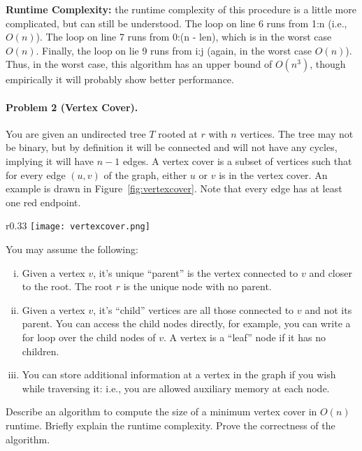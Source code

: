 \documentclass[11pt]{article}
\begin{document}
\textbf{Runtime Complexity:} the runtime complexity of this procedure is a little more complicated, but can still be understood. The loop on line 6 runs from 1:n (i.e., $O(n)$). The loop on line 7 runs from 0:(n - len), which is in the worst case $O(n)$. Finally, the loop on lie 9 runs from i:j (again, in the worst case $O(n)$). Thus, in the worst case, this algorithm has an upper bound of $O(n^3)$, though empirically it will probably show better performance.

\newpage
\paragraph{Problem 2 (Vertex Cover).} You are given an undirected tree $T$ rooted at $r$ with $n$ vertices. The tree may not be binary, but by definition it will be connected and will not have any cycles, implying it will have $n-1$ edges. A vertex cover is a subset of vertices such that for every edge $(u, v)$ of the graph, either $u$ or $v$ is in the vertex cover. An  example is drawn in Figure~\ref{fig:vertexcover}. Note that every edge has at least one red endpoint.

\begin{wrapfigure}{r}{0.33\textwidth}
    \centering
    \texttt{[image: vertexcover.png]}
    \caption{Example tree and vertex cover shown in shaded red.}
    \label{fig:vertexcover}
\end{wrapfigure}

You may assume the following:

\begin{enumerate}[(i)]
    \item Given a vertex $v$, it's unique ``parent'' is the vertex connected to $v$ and closer to the root. The root $r$ is the unique node with no parent.
    \item Given a vertex $v$, it's ``child'' vertices are all those connected to $v$ and not its parent. You can access the child nodes directly, for example, you can write a for loop over the child nodes of $v$. A vertex is a ``leaf'' node if it has no children.
    \item You can store additional information at a vertex in the graph if you wish while traversing it: i.e., you are allowed auxiliary memory at each node.
\end{enumerate}
Describe an algorithm to compute the size of a minimum vertex cover in $O(n)$ runtime. Briefly explain the runtime complexity. Prove the correctness of the algorithm.
\end{document}
